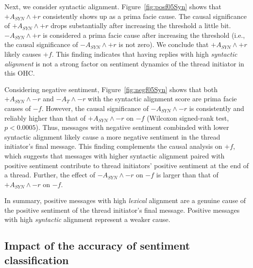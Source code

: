 Next, we consider syntactic alignment. Figure~\ref{fig:posf05Syn} shows that $+A_{SYN} \wedge +r$ consistently shows up as a prima facie cause. The causal significance of $+A_{SYN} \wedge +r$ drops substantially after increasing the threshold a little bit. $-A_{SYN} \wedge +r$ is considered a prima facie cause after increasing the threshold (i.e., the causal significance of $-A_{SYN} \wedge +r$ is not zero). We conclude that $+A_{SYN} \wedge +r$ likely causes $+f$. This finding indicates that having replies with high \emph{syntactic alignment} is not a strong factor on sentiment dynamics of the thread initiator in this OHC.

Considering negative sentiment, Figure~\ref{fig:negf05Syn} shows that both $+A_{SYN} \wedge -r$ and $-A_T \wedge -r$ with the syntactic alignment score are prima facie causes of $-f$. However, the causal significance of $-A_{SYN} \wedge -r$ is consistently and reliably higher than that of $+A_{SYN} \wedge -r$ on $-f$ (Wilcoxon signed-rank test, $p<0.0005$). Thus, messages with negative sentiment combinded with lower syntactic alignment likely cause a more negative sentiment in the thread initiator's final message. This finding complements the causal analysis on $+f$, which suggests that messages with higher syntactic alignment paired with positive sentiment contribute to thread initiators' positive sentiment at the end of a thread. Further, the effect of $-A_{SYN} \wedge -r$ on $-f$ is larger than that of $+A_{SYN} \wedge -r$ on $-f$.

In summary, positive messages with high \emph{lexical} alignment are a genuine cause of the positive sentiment of the thread initiator's final message. Positive messages with high \emph{syntactic} alignment represent a weaker cause.


\subsection{Impact of the accuracy of sentiment classification}


